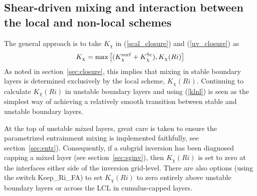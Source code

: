 \documentclass{UMDP_article}
\begin{document}
\subsection{Shear-driven mixing and interaction between the local and
  non-local schemes}
\label{sec:shear}
The general approach is to take $K_{\chi}$ in (\ref{scal_closure}) and
(\ref{uv_closure}) as
\begin{equation}
  K_{\chi} = \mbox{max} \left[ (K_{\chi}^{\rm surf}+K_{\chi}^{\rm Sc}), 
                              K_{\chi}(Ri) \right]
  \label{klnl}
\end{equation}
As noted in section~\ref{sec:closure}, this implies that mixing in
stable boundary layers is determined exclusively by the local scheme,
$K_{\chi}(Ri)$.  Continuing to calculate $K_{\chi}(Ri)$ in unstable
boundary layers and using (\ref{klnl}) is seen as the simplest way of
achieving a relatively smooth transition between stable and unstable
boundary layers.

At the top of unstable mixed layers, great care is taken to ensure the
parametrized entrainment mixing is implemented faithfully, see
section~\ref{sec:entr}).  Consequently, if a subgrid inversion has
been diagnosed capping a mixed layer (see section~\ref{sec:sginv}),
then $K_{\chi}(Ri)$ is set to zero at the interfaces either side of
the inversion grid-level.  There are also options (using the switch
Keep\_Ri\_FA) to set $K_{\chi}(Ri)$ to zero entirely above unstable
boundary layers or across the LCL in cumulus-capped layers.
\end{document}
